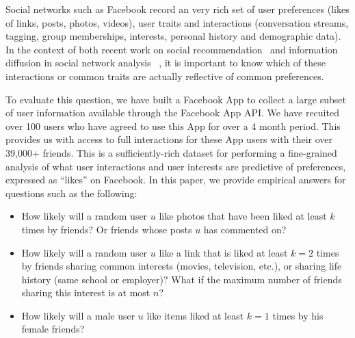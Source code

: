 
\label{sec:introduction}
Social networks such as Facebook record an very rich set of user
preferences  (likes of links, posts, photos, videos), user traits
and interactions (conversation streams, tagging, group memberships,
interests, personal history and demographic data).  In the context of
both recent work on social recommendation~\cite{sorec,ste,lla} and
information diffusion in social network analysis
~\cite{Goel2012structure,Romero2011hashtag,Bakshy2012chamber}, 
it is important to know which of these interactions or common traits
are actually reflective of common preferences.

\cite{Panigrahy2012ubr}
\cite{Goel2012structure}

To evaluate this question, we have built a Facebook App to collect a
large subset of user information available through the Facebook App
API. We have recuited over 100 users who have agreed to use this App for over a 4
month period.  This provides us with access to full interactions
for these App users with their over 39,000+ friends. This is a sufficiently-rich dataset
for  performing a fine-grained analysis of what user interactions
and user interests are predictive of preferences, 
expressed as ``likes'' on Facebook. In this paper,
we provide empirical answers for questions such as the following:
\begin{itemize}
\item How likely will a random user $u$ like
photos that have been liked at least $k$ times by friends? 
Or friends whose posts $u$ has commented on?
\item How likely will a random user $u$ like a
link that is liked at least $k=2$ times by friends sharing common interests
(movies, television, etc.), or sharing life history (same school or employer)? 
What if the maximum number of friends sharing this interest is at most $n$?
\item How likely will a male user $u$ like
items liked at least $k=1$ times by his female friends?
\end{itemize}

